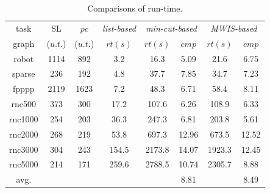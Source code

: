 \documentclass[10pt,journal]{IEEEtran}
\begin{document}
\begin{table}[!h]
\renewcommand{\arraystretch}{1.1}
\caption{Comparisons of run-time.}
\centering
\begin{tabular}{c|c|c|c|c|c|c|c}
\hline
\hline
task                             &SL           &$pc$        & \hspace*{-0.5em}\textit{list-based}\hspace*{-0.5em}        &\multicolumn{2}{c|}{\textit{min-cut-based}}   &\multicolumn{2}{c}{\textit{MWIS-based}}        \\  \cline{5-6} \cline{7-8}
graph                                                   &\hspace*{-1em}($u.t.$)\hspace*{-1em}         &($u.t.$)       &$rt(s)$       &$rt(s)$    &$cmp$   &$rt(s)$     &$cmp$    \\
\hline
\hline

robot              &1114      &892  &3.2     &16.3         &5.09 &21.6  &6.75     \\


sparse              &236       &192  &4.8  &37.7       &7.85   &34.7  &7.23   \\

fpppp           &2119  &1623  &7.2 &48.3   &6.71 &58.4    &8.11  \\

rnc500            &373    &300   &17.2  &107.6   &6.26  &108.9   &6.33  \\

rnc1000            &254  &203    &36.3 &247.3  &6.81   &203.8    &5.61   \\

rnc2000          &268    &219    &53.8  &697.3      &12.96   &673.5  &12.52   \\

rnc3000           &304  &243  &154.5  &\hspace*{-0.5em}2173.8\hspace*{-0.5em}  &14.07  &\hspace*{-0.5em}1923.3\hspace*{-0.5em}    &12.45  \\

rnc5000          &214   &171  &259.6  &\hspace*{-0.5em}2788.5\hspace*{-0.5em}  &10.74  &\hspace*{-0.5em}2305.7\hspace*{-0.5em}   &8.88    \\

\hline

avg.          &    &  &   &   &8.81  &   &8.49       \\
\hline
\hline
\end{tabular}
\label{table:VPCTC}
\end{table}
\end{document}
